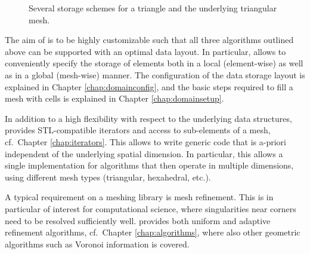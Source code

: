 \begin{figure}[bt]
{ }
 \caption{Several storage schemes for a triangle and the underlying triangular mesh.}
 \label{fig:storage-schemes-triangle}
\end{figure}

The aim of {\ViennaGrid} is to be highly customizable such that all three algorithms outlined above can be supported with an optimal data layout. In particular, {\ViennaGrid} allows to conveniently specify the storage of elements both in a local (element-wise) as well as in a global (mesh-wise) manner. The configuration of the data storage layout is explained in Chapter \ref{chap:domainconfig}, and the basic steps required to fill a mesh with cells is explained in Chapter \ref{chap:domainsetup}.

In addition to a high flexibility with respect to the underlying data structures, {\ViennaGrid} provides STL-compatible iterators and access to sub-elements of a mesh, cf.~Chapter \ref{chap:iterators}. This allows to write generic code that is a-priori independent of the underlying spatial dimension. In particular, this allows a single implementation for algorithms that then operate in multiple dimensions, using different mesh types (triangular, hexahedral, etc.).

A typical requirement on a meshing library is mesh refinement. This is in particular of interest for computational science, where singularities near corners need to be resolved sufficiently well. {\ViennaGrid} provides both uniform and adaptive refinement algorithms, cf.~Chapter \ref{chap:algorithms}, where also other geometric algorithms such as Voronoi information is covered.


